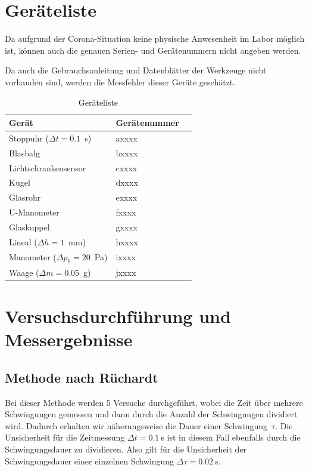 \documentclass{article}
\begin{document}
\newpage
\section{Geräteliste}


Da aufgrund der Corona-Situation keine physische Anwesenheit im Labor möglich ist, können auch die genauen Serien- und Gerätenummern nicht angeben werden.

Da auch die Gebrauchsanleitung und Datenblätter der Werkzeuge nicht vorhanden sind, werden die Messfehler dieser Geräte geschätzt.


\begin{table}[h]
\caption{Geräteliste}

\begin{tabular}{lll}
Gerät  & Gerätenummer \\
\hline
Stoppuhr ($\Delta t = 0.1$~s) & axxxx \\
Blasbalg & bxxxx \\
Lichtschrankensensor & cxxxx \\
Kugel & dxxxx \\
Glasrohr & exxxx \\
U-Manometer & fxxxx \\
Glaskuppel & gxxxx \\
Lineal ($\Delta h=1$~mm) & hxxxx \\
Manometer ($\Delta p_0 = 20$~Pa) & ixxxx \\
Waage ($\Delta m = 0.05$~g) & jxxxx
\end{tabular}
\end{table}

\newpage
\section{Versuchsdurchführung und Messergebnisse}

\subsection{Methode nach Rüchardt}

Bei dieser Methode werden 5 Versuche durchgeführt, wobei die Zeit über mehrere Schwingungen gemessen und dann durch die Anzahl der Schwingungen dividiert wird. Dadurch erhalten wir näherungsweise die Dauer einer Schwingung~$\tau$. Die Unsicherheit für die Zeitmessung $\Delta t = 0.1~$s ist in diesem Fall ebenfalls durch die Schwingungsdauer zu dividieren. Also gilt für die Unsicherheit der Schwingungsdauer einer einzelnen Schwingung $\Delta \tau = 0.02~$s.
\end{document}
